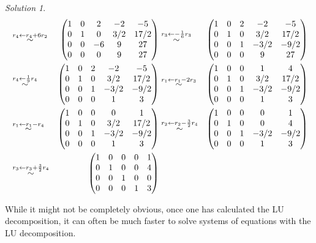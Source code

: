 \documentclass[
]{book}
\theoremstyle{definition}
\theoremstyle{definition}
\theoremstyle{definition}
\theoremstyle{definition}
\theoremstyle{remark}
\newtheorem*{solution}{Solution}
\begin{document}
\begin{solution}
\[\begin{aligned}
& \stackrel{r_4 \leftarrow r_4 + 6 r_2}{\huge \sim} & \begin{pmatrix} 1 & 0 & 2 & -2 & -5 \\ 0 & 1 & 0 & 3/2 & 17/2 \\ 0 & 0 & -6 & 9 & 27 \\ 0 & 0 & 0 & 9 & 27 \end{pmatrix} & 
\stackrel{r_3 \leftarrow - \frac{1}{6} r_3}{\huge \sim} & \begin{pmatrix} 1 & 0 & 2 & -2 & -5 \\ 0 & 1 & 0 & 3/2 & 17/2 \\ 0 & 0 & 1 & -3/2 & -9/2 \\ 0 & 0 & 0 & 9 & 27 \end{pmatrix}\\
& \stackrel{r_4 \leftarrow \frac{1}{9} r_4}{\huge \sim} & \begin{pmatrix} 1 & 0 & 2 & -2 & -5 \\ 0 & 1 & 0 & 3/2 & 17/2 \\ 0 & 0 & 1 & -3/2 & -9/2 \\ 0 & 0 & 0 & 1 & 3 \end{pmatrix} & \stackrel{r_1 \leftarrow r_1 - 2 r_3}{\huge \sim} & \begin{pmatrix} 1 & 0 & 0 & 1 & 4 \\ 0 & 1 & 0 & 3/2 & 17/2 \\ 0 & 0 & 1 & -3/2 & -9/2 \\ 0 & 0 & 0 & 1 & 3 \end{pmatrix} \\
& \stackrel{r_1 \leftarrow r_1 - r_4}{\huge \sim} & \begin{pmatrix} 1 & 0 & 0 & 0 & 1 \\ 0 & 1 & 0 & 3/2 & 17/2 \\ 0 & 0 & 1 & -3/2 & -9/2 \\ 0 & 0 & 0 & 1 & 3 \end{pmatrix} & 
\stackrel{r_2 \leftarrow r_2 - \frac{3}{2} r_4}{\huge \sim} & \begin{pmatrix} 1 & 0 & 0 & 0 & 1 \\ 0 & 1 & 0 & 0 & 4 \\ 0 & 0 & 1 & -3/2 & -9/2 \\ 0 & 0 & 0 & 1 & 3 \end{pmatrix} \\
& \stackrel{r_3 \leftarrow r_3 + \frac{3}{2} r_4}{\huge \sim} & \begin{pmatrix} 1 & 0 & 0 & 0 & 1 \\ 0 & 1 & 0 & 0 & 4 \\ 0 & 0 & 1 & 0 & 0 \\ 0 & 0 & 0 & 1 & 3 \end{pmatrix}  
\end{aligned}
\]

While it might not be completely obvious, once one has calculated the LU decomposition, it can often be much faster to solve systems of equations with the LU decomposition.
\end{solution}
\end{document}
